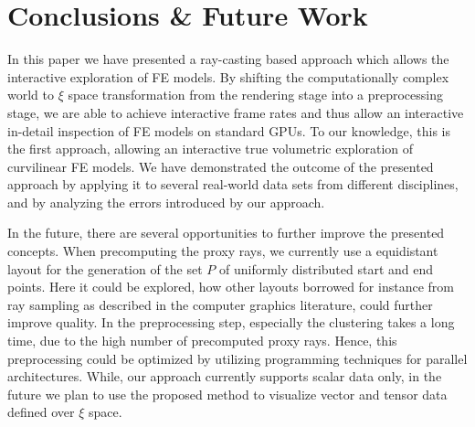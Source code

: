 \documentclass[review,journal]{vgtc}         %
\begin{document}
\section{Conclusions \& Future Work}\label{sec:conclusions}
In this paper we have presented a ray-casting based approach which allows the interactive exploration of FE models. By shifting the computationally complex world to $\xi$ space transformation from the rendering stage into a preprocessing stage, we are able to achieve interactive frame rates and thus allow an interactive in-detail inspection of FE models on standard GPUs. To our knowledge, this is the first approach, allowing an interactive true volumetric exploration of curvilinear FE models. We have demonstrated the outcome of the presented approach by applying it to several real-world data sets from different disciplines, and by analyzing the errors introduced by our approach.

In the future, there are several opportunities to further improve the presented concepts. When precomputing the proxy rays, we currently use a equidistant layout for the generation of the set $P$ of uniformly distributed start and end points. Here it could be explored, how other layouts borrowed for instance from ray sampling as described in the computer graphics literature, could further improve quality. In the preprocessing step, especially the clustering takes a long time, due to the high number of precomputed proxy rays. Hence, this preprocessing could be optimized by utilizing programming techniques for parallel architectures. While, our approach currently supports scalar data only, in the future we plan to use the proposed method to visualize vector and tensor data defined over $\xi$ space.





\end{document}
